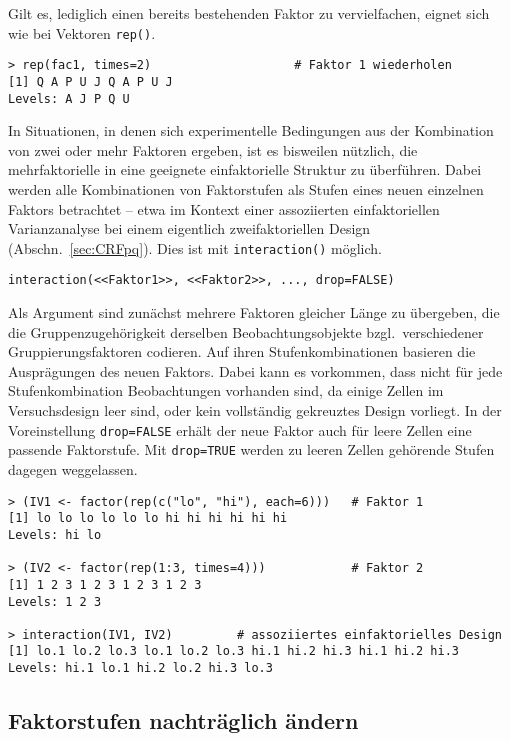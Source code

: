 Gilt es, lediglich einen bereits bestehenden Faktor zu vervielfachen, eignet sich wie bei Vektoren \lstinline!rep()!.
\begin{lstlisting}
> rep(fac1, times=2)                    # Faktor 1 wiederholen
[1] Q A P U J Q A P U J
Levels: A J P Q U
\end{lstlisting}

In Situationen, in denen sich experimentelle Bedingungen aus der Kombination von zwei oder mehr Faktoren ergeben, ist es bisweilen nützlich, die mehrfaktorielle in eine geeignete einfaktorielle Struktur zu überführen. Dabei werden alle Kombinationen von Faktorstufen als Stufen eines neuen einzelnen Faktors betrachtet -- etwa im Kontext einer assoziierten einfaktoriellen Varianzanalyse bei einem eigentlich zweifaktoriellen Design (Abschn.\ \ref{sec:CRFpq}). Dies ist mit \lstinline!interaction()! möglich.
\begin{lstlisting}
interaction(<<Faktor1>>, <<Faktor2>>, ..., drop=FALSE)
\end{lstlisting}

Als Argument sind zunächst mehrere Faktoren gleicher Länge zu übergeben, die die Gruppenzugehörigkeit derselben Beobachtungsobjekte bzgl.\ verschiedener Gruppierungsfaktoren codieren. Auf ihren Stufenkombinationen basieren die Ausprägungen des neuen Faktors. Dabei kann es vorkommen, dass nicht für jede Stufenkombination Beobachtungen vorhanden sind, da einige Zellen im Versuchsdesign leer sind, oder kein vollständig gekreuztes Design vorliegt. In der Voreinstellung \lstinline!drop=FALSE! erhält der neue Faktor auch für leere Zellen eine passende Faktorstufe. Mit \lstinline!drop=TRUE! werden zu leeren Zellen gehörende Stufen dagegen weggelassen.
\begin{lstlisting}
> (IV1 <- factor(rep(c("lo", "hi"), each=6)))   # Faktor 1
[1] lo lo lo lo lo lo hi hi hi hi hi hi
Levels: hi lo

> (IV2 <- factor(rep(1:3, times=4)))            # Faktor 2
[1] 1 2 3 1 2 3 1 2 3 1 2 3
Levels: 1 2 3

> interaction(IV1, IV2)         # assoziiertes einfaktorielles Design
[1] lo.1 lo.2 lo.3 lo.1 lo.2 lo.3 hi.1 hi.2 hi.3 hi.1 hi.2 hi.3
Levels: hi.1 lo.1 hi.2 lo.2 hi.3 lo.3
\end{lstlisting}

\subsection{Faktorstufen nachträglich ändern}
\label{sec:facChangeLevels}

